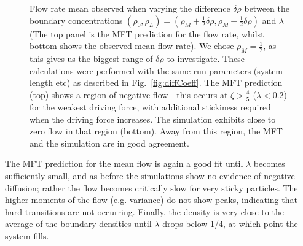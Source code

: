 \documentclass[
reprint, amsmath,amssymb,
]{revtex4-1}
\begin{document}
\begin{figure}[h!]
\begin{center}
\begin{tabular}{c}
    \end{tabular}
\end{center}
    \vspace{0em}
\caption{\label{fig:constDens} Flow rate mean observed when varying the difference $\delta\rho$ between the boundary concentrations
$(\rho_0, \rho_L) = (\rho_M + \frac{1}{2} \delta\rho, \rho_M - \frac{1}{2} \delta\rho)$ and $\lambda$ (The top panel is the MFT prediction
for the flow rate, whilst bottom shows the observed mean flow rate).
We chose $\rho_M=\frac{1}{2}$, as this gives us the biggest range of $\delta\rho$ to investigate.
These calculations were performed with the same run parameters (system length etc) as described in Fig.~\ref{fig:diffCoeff}.
The MFT prediction (top) shows a region of
negative flow - this occurs at $\zeta > \frac{4}{5}$ ($\lambda < 0.2$) for the weakest
driving force, with additional stickiness required when the driving
force increases. The simulation exhibits close to zero flow in that
region (bottom).  Away from this region, the MFT and
the simulation are in good agreement.
}
\end{figure}
The MFT prediction for the mean flow is again a good fit until $\lambda$ becomes sufficiently small,
and as before the simulations show no evidence of negative diffusion; rather the flow becomes critically slow for very sticky particles.
The higher moments of the flow (e.g. variance) do not show peaks, indicating that hard transitions are not occurring.
Finally, the density is very close to the average of the boundary densities until $\lambda$ drops below 1/4, at which point the system fills.
\end{document}
